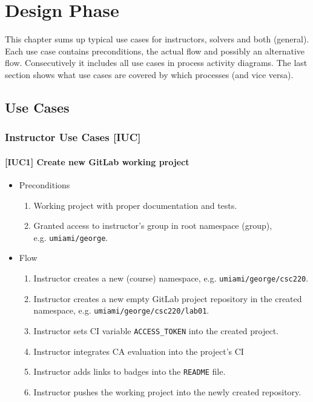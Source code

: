 \chapter{Design Phase} \label{chap:design}

{This chapter sums up typical use cases for instructors, solvers and both (general). Each use case contains preconditions, the actual flow and possibly an alternative flow. Consecutively it includes all use cases in process activity diagrams. The last section shows what use cases are covered by which processes (and vice versa).}

\section{Use Cases} \label{sec:uc}

\subsection{{Instructor Use Cases {[}IUC{]}}} \label{ssec:iuc}

\subsubsection{{[}IUC1{]} Create new GitLab working project}

\begin{itemize}
\item
  {Preconditions}
    \begin{enumerate}
    \item 
      {Working project with proper documentation and tests.}
    \item
      {Granted access to instructor's group in root namespace (group), \\ e.g. \texttt{umiami/george}.}
    \end{enumerate}
\end{itemize}

\begin{itemize}
\item
  {Flow}
    \begin{enumerate}
    \item
      {Instructor creates a new (course) namespace, e.g. \texttt{umiami/george/csc220}.}
    \item
      {Instructor creates a new empty GitLab project repository in the created namespace, e.g. \texttt{umiami/george/csc220/lab01}.}
    \item
      {Instructor sets CI variable \texttt{ACCESS\_TOKEN} into the created project.}
    \item
      {Instructor integrates CA evaluation into the project's CI}
    \item
      {Instructor adds links to badges into the \texttt{README} file.}
    \item
      {Instructor pushes the working project into the newly created repository.}
    \end{enumerate}
\end{itemize}

